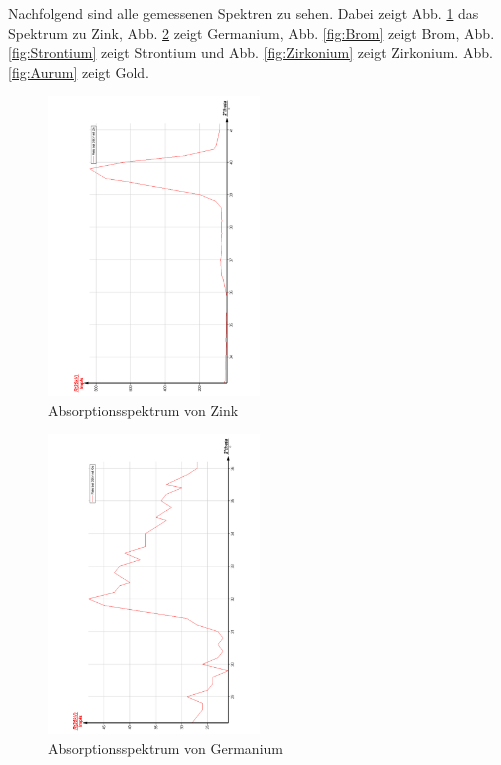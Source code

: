 Nachfolgend sind alle gemessenen Spektren zu sehen. Dabei zeigt Abb. \ref{fig:Zink}
das Spektrum zu Zink, Abb. \ref{fig:Germanium} zeigt Germanium, Abb. \ref{fig:Brom}
zeigt Brom, Abb. \ref{fig:Strontium} zeigt Strontium und Abb. \ref{fig:Zirkonium} zeigt
Zirkonium. Abb. \ref{fig:Aurum} zeigt Gold.
\begin{figure}
  \centering
  \includegraphics[width=0.5\textwidth, angle=270]{bilder/AbsorpZn.pdf}
  \caption{Absorptionsspektrum von Zink}
  \label{fig:Zink}
\end{figure}
\begin{figure}
  \centering
  \includegraphics[width=0.5\textwidth, angle=270]{bilder/AbsorpGe.pdf}
  \caption{Absorptionsspektrum von Germanium}
  \label{fig:Germanium}
\end{figure}
